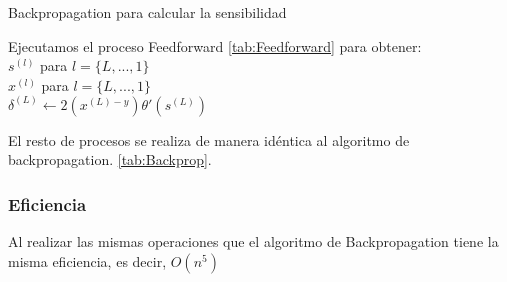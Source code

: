 \begin{algorithm}[H]
   \caption{Backpropagation para calcular la sensibilidad}
   Ejecutamos el proceso Feedforward \ref{tab:Feedforward} para obtener:\\
   $s^{(l)}$ para $l = \{L,...,1\}$ \\
   $x^{(l)}$ para $l = \{L,...,1\}$ \\  
   $\delta^{(L)} \gets 2(x^{(L)-y})\theta'(s^{(L)})$ \\
   
\end{algorithm}

El resto de procesos se realiza de manera idéntica al algoritmo de backpropagation. \ref{tab:Backprop}.

\subsubsection{Eficiencia}

Al realizar las mismas operaciones que el algoritmo de Backpropagation tiene la misma eficiencia, es decir, $O(n^{5})$


